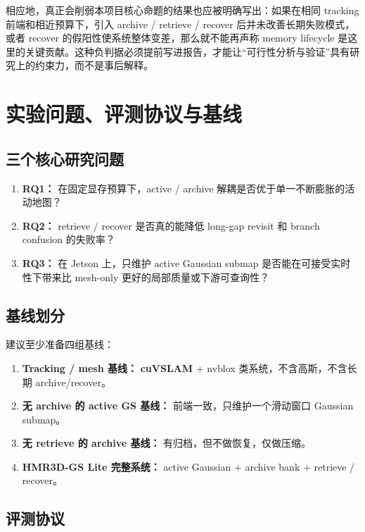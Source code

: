 \documentclass[12pt]{article}
\newcommand{\system}{\textbf{HMR3D-GS Lite}}
\newcommand{\cuvslam}{\textbf{cuVSLAM}}
\begin{document}
相应地，真正会削弱本项目核心命题的结果也应被明确写出：如果在相同 tracking 前端和相近预算下，引入 archive / retrieve / recover 后并未改善长期失败模式，或者 recover 的假阳性使系统整体变差，那么就不能再声称 memory lifecycle 是这里的关键贡献。这种负判据必须提前写进报告，才能让“可行性分析与验证”具有研究上的约束力，而不是事后解释。

\section{实验问题、评测协议与基线}

\subsection{三个核心研究问题}

\begin{enumerate}
  \item \textbf{RQ1：} 在固定显存预算下，active / archive 解耦是否优于单一不断膨胀的活动地图？
  \item \textbf{RQ2：} retrieve / recover 是否真的能降低 long-gap revisit 和 branch confusion 的失败率？
  \item \textbf{RQ3：} 在 Jetson 上，只维护 active Gaussian submap 是否能在可接受实时性下带来比 mesh-only 更好的局部质量或下游可查询性？
\end{enumerate}

\subsection{基线划分}

建议至少准备四组基线：
\begin{enumerate}
  \item \textbf{Tracking / mesh 基线：} \cuvslam{} + nvblox 类系统，不含高斯，不含长期 archive/recover。
  \item \textbf{无 archive 的 active GS 基线：} 前端一致，只维护一个滑动窗口 Gaussian submap。
  \item \textbf{无 retrieve 的 archive 基线：} 有归档，但不做恢复，仅做压缩。
  \item \textbf{\system{} 完整系统：} active Gaussian + archive bank + retrieve / recover。
\end{enumerate}

\subsection{评测协议}
\end{document}
